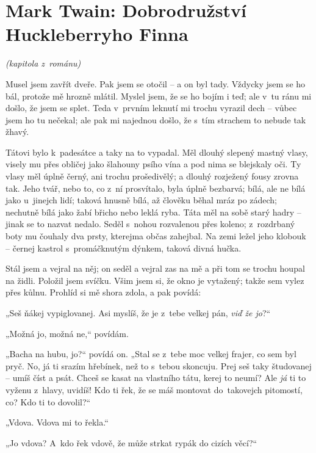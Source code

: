 \section{Mark Twain: Dobrodružství \\ Huckleberryho Finna}

\noindent
\textit{(kapitola z románu)}

\medskip


\noindent
Musel jsem zavřít dveře. Pak jsem se otočil – a on byl tady. Vždycky jsem se ho bál, protože mě hrozně mlátil. Myslel jsem, že se ho bojím i teď; ale v tu ránu mi došlo, že jsem se splet. Teda v~prvním leknutí mi trochu vyrazil dech – vůbec jsem ho tu nečekal; ale pak mi najednou došlo, že s tím strachem to nebude tak žhavý.

Tátovi bylo k~padesátce a taky na to vypadal. Měl dlouhý slepený mastný vlasy, visely mu přes obličej jako šlahouny psího vína a pod nima se blejskaly oči. Ty vlasy měl úplně černý, ani trochu prošedivělý; a dlouhý rozježený fousy zrovna tak. Jeho tvář, nebo to, co z ní prosvítalo, byla úplně bezbarvá; bílá, ale ne bílá jako u~jinejch lidí; taková hnusně bílá, až člověku běhal mráz po zádech; nechutně bílá jako žabí břicho nebo leklá ryba. Táta měl na sobě starý hadry – jinak se to nazvat nedalo. Seděl s nohou rozvalenou přes koleno; z rozdrbaný boty mu čouhaly dva prsty, kterejma občas zahejbal. Na zemi ležel jeho klobouk – černej kastrol s promáčknutým dýnkem, taková divná hučka.

Stál jsem a vejral na něj; on seděl a vejral zas na mě a při tom se trochu houpal na židli. Položil jsem svíčku. Všim jsem si, že okno je vytažený; takže sem vylez přes kůlnu. Prohlíd si mě shora zdola, a pak povídá:

„Seš ňákej vypiglovanej. Asi myslíš, že je z tebe velkej pán, \textit{viď že jo}?“

„Možná jo, možná ne,“ povídám.

„Bacha na hubu, jo?“ povídá on. „Stal se z tebe moc velkej frajer, co sem byl pryč. No, já ti srazím hřebínek, než to s tebou skoncuju. Prej seš taky študovanej – umíš číst a psát. Chceš se kasat na vlastního tátu, kerej to neumí? Ale \textit{já} ti to vyženu z hlavy, uvidíš! Kdo ti řek, že se máš montovat do takovejch pitomostí, co? Kdo ti to dovolil?“

„Vdova. Vdova mi to řekla.“

„Jo vdova? A~kdo řek vdově, že může strkat rypák do cizích věcí?“

